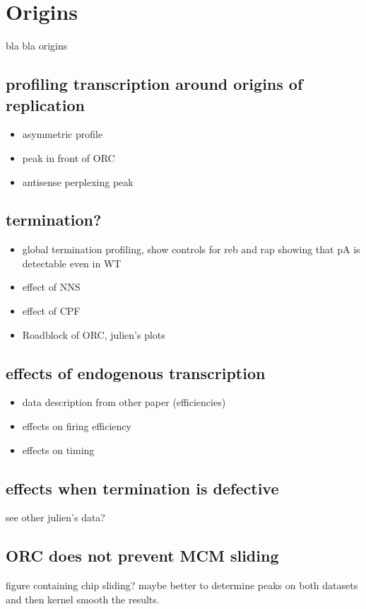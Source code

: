 \chapter{Origins	}
bla bla origins

\section{profiling transcription around origins of replication}

\begin{itemize}
\item asymmetric profile
\item peak in front of ORC
\item antisense perplexing peak
\end{itemize}

\section{termination?}

\begin{itemize}
\item global termination profiling, show controls for reb and rap showing that pA is detectable even in WT
\item effect of NNS
\item effect of CPF
\item Roadblock of ORC, julien's plots

\end{itemize}



\section{effects of endogenous transcription}

\begin{itemize}
\item data description from other paper (efficiencies)
\item effects on firing efficiency
\item effects on timing
\end{itemize}

\section{effects when termination is defective}

see other julien's data? 

\section{ORC does not prevent MCM sliding}

figure containing chip sliding? maybe better to determine peaks on both datasets and then kernel smooth the results.